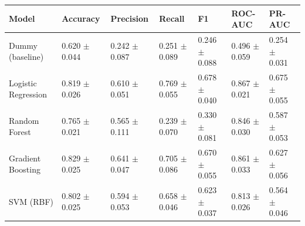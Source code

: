 \begin{tabular}{lllllll}
\toprule
Model & Accuracy & Precision & Recall & F1 & ROC-AUC & PR-AUC \\
\midrule
Dummy (baseline) & 0.620 $\pm$ 0.044 & 0.242 $\pm$ 0.087 & 0.251 $\pm$ 0.089 & 0.246 $\pm$ 0.088 & 0.496 $\pm$ 0.059 & 0.254 $\pm$ 0.031 \\
Logistic Regression & 0.819 $\pm$ 0.026 & 0.610 $\pm$ 0.051 & 0.769 $\pm$ 0.055 & 0.678 $\pm$ 0.040 & 0.867 $\pm$ 0.021 & 0.675 $\pm$ 0.055 \\
Random Forest & 0.765 $\pm$ 0.021 & 0.565 $\pm$ 0.111 & 0.239 $\pm$ 0.070 & 0.330 $\pm$ 0.081 & 0.846 $\pm$ 0.030 & 0.587 $\pm$ 0.053 \\
Gradient Boosting & 0.829 $\pm$ 0.025 & 0.641 $\pm$ 0.047 & 0.705 $\pm$ 0.086 & 0.670 $\pm$ 0.055 & 0.861 $\pm$ 0.033 & 0.627 $\pm$ 0.056 \\
SVM (RBF) & 0.802 $\pm$ 0.025 & 0.594 $\pm$ 0.053 & 0.658 $\pm$ 0.046 & 0.623 $\pm$ 0.037 & 0.813 $\pm$ 0.026 & 0.564 $\pm$ 0.046 \\
\bottomrule
\end{tabular}
